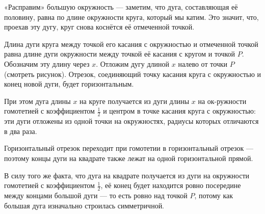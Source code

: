 \begin{itemize}
\itA «Расправим» большую окружность — заметим, что дуга, составляющая её половину, равна по длине окружности круга, который мы катим. Это значит, что, проехав эту дугу, круг снова коснётся её отмеченной точкой.

\begin{center}
\end{center}

\itB Длина дуги круга между точкой его касания с окружностью и отмеченной точкой равна длине дуги окружности между точкой её касания с кругом и точкой $P$. Обозначим эту длину через $x$. Отложим дугу длиной $x$ налево от точки $P$ (смотреть рисунок). Отрезок, соединяющий точку касания круга с окружностью и конец новой дуги, будет горизонтальным.

При этом дуга длины $x$ на круге получается из дуги длины $x$ на ок-\linebreak ружности гомотетией с коэффициентом $\tfrac{1}{2}$ и центром в точке касания круга с окружностью: эти дуги отложены из одной точки на окружностях, радиусы которых отличаются в два раза.

Горизонтальный отрезок переходит при гомотетии в горизонтальный отрезок — поэтому концы дуги на квадрате также лежат на одной горизонтальной прямой.

\itC В силу того же факта, что дуга на квадрате получается из дуги на окружности гомотетией с коэффициентом $\tfrac{1}{2}$, её конец будет находится ровно посередине между концами большой дуги — то есть ровно над точкой $P$, потому как большая дуга изначально строилась симметричной.
\end{itemize}